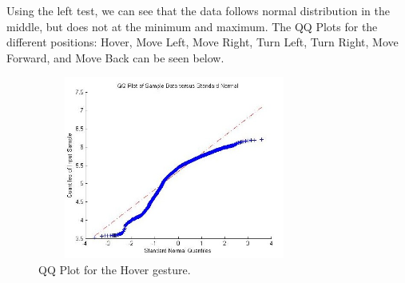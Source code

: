 \documentclass[letterpaper,english, 12pt]{article}
\begin{document}
Using the left test, we can see that the data follows normal distribution in the middle, but does not at the minimum and maximum.  The QQ Plots for the different positions: Hover, Move Left, Move Right, Turn Left, Turn Right, Move Forward, and Move Back can be seen below.  

\begin{figure}[t]
	\centering
	\includegraphics[height=6cm,width=90mm]{pics/qqHover.jpg}
	\caption{QQ Plot for the Hover gesture.}
\end{figure}

\begin{figure}[t]
\centering
{}
	\hspace{0.5cm}
\end{figure}
\end{document}
